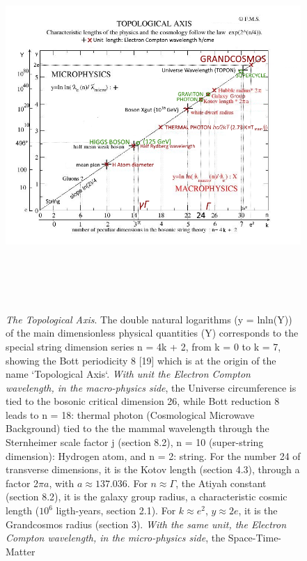 \documentclass[twoside,draft]{article}
\begin{document}
\begin{sloppypar}
\begin{figure}
\centering
\includegraphics[width=\textwidth,height=14cm]{./figures/figure}
\caption{\textit{The Topological Axis}. The double natural logarithms (y = lnln(Y)) of the main dimensionless physical quantities (Y) corresponds to the special string dimension series n = 4k + 2, from k = 0 to k = 7, showing the Bott
periodicity 8 [19] which is at the origin of the name `Topological Axis`. 
\textit{With unit the Electron Compton wavelength, in the macro-physics side}, the Universe circumference 
    is tied to the bosonic critical dimension 26, while Bott reduction 8 leads to n = 18: thermal photon (Cosmological Microwave Background) tied to the the mammal wavelength through the Sternheimer scale factor j (section 8.2), n = 10 (super-string dimension): Hydrogen atom, and n = 2: string. For the number 24 of transverse dimensions, it is
    the Kotov length (section 4.3), through a factor 2$\pi a$, with $a \approx 137.036$. For $n \approx \Gamma $, the Atiyah constant (section 8.2), it is the galaxy group radius, a characteristic cosmic length ($10^{6}$ ligth-years, section 2.1). For $k \approx e^{2}$, $y \approx 2e$, it is the Grandcosmos radius (section 3).
   \textit{With the same unit, the Electron Compton wavelength, in the micro-physics side}, the Space-Time-Matter
}
\end{figure}
\end{sloppypar}
\end{document}
